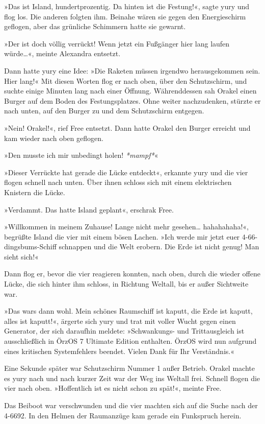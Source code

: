 »Das ist Island, hundertprozentig. Da hinten ist die Festung!«, sagte yury und flog los. Die anderen folgten ihm. Beinahe wären sie gegen den Energieschirm geflogen, aber das grünliche Schimmern hatte sie gewarnt.

»Der ist doch völlig verrückt! Wenn jetzt ein Fußgänger hier lang laufen würde…«, meinte Alexandra entsetzt.

Dann hatte yury eine Idee: »Die Raketen müssen irgendwo herausgekommen sein. Hier lang!« Mit diesen Worten flog er nach oben, über den Schutzschirm, und suchte einige Minuten lang nach einer Öffnung. Währenddessen sah Orakel einen Burger auf dem Boden des Festungsplatzes. Ohne weiter nachzudenken, stürzte er nach unten, auf den Burger zu und dem Schutzschirm entgegen.

»Nein! Orakel!«, rief Free entsetzt. Dann hatte Orakel den Burger erreicht und kam wieder nach oben geflogen.

»Den musste ich mir unbedingt holen! \textit{*mampf*}«

»Dieser Verrückte hat gerade die Lücke entdeckt«, erkannte yury und die vier flogen schnell nach unten. Über ihnen schloss sich mit einem elektrischen Knistern die Lücke.

»Verdammt. Das hatte Island geplant«, erschrak Free.

»Willkommen in meinem Zuhause! Lange nicht mehr gesehen… hahahahaha!«, begrüßte Island die vier mit einem bösen Lachen. »Ich werde mir jetzt euer 4-66-dingsbums-Schiff schnappen und die Welt erobern. Die Erde ist nicht genug! Man sieht sich!«

Dann flog er, bevor die vier reagieren konnten, nach oben, durch die wieder offene Lücke, die sich hinter ihm schloss, in Richtung Weltall, bis er außer Sichtweite war.

»Das wars dann wohl. Mein schönes Raumschiff ist kaputt, die Erde ist kaputt, alles ist kaputt!«, ärgerte sich yury und trat mit voller Wucht gegen einen Generator, der sich daraufhin meldete: »Schwankungs- und Trittausgleich ist ausschließlich in ÖrzOS 7 Ultimate Edition enthalten. ÖrzOS wird nun aufgrund eines kritischen Systemfehlers beendet. Vielen Dank für Ihr Verständnis.«

Eine Sekunde später war Schutzschirm Nummer 1 außer Betrieb. Orakel machte es yury nach und nach kurzer Zeit war der Weg ins Weltall frei. Schnell flogen die vier nach oben. »Hoffentlich ist es nicht schon zu spät!«, meinte Free.

Das Beiboot war verschwunden und die vier machten sich auf die Suche nach der 4-6692. In den Helmen der Raumanzüge kam gerade ein Funkspruch herein.

